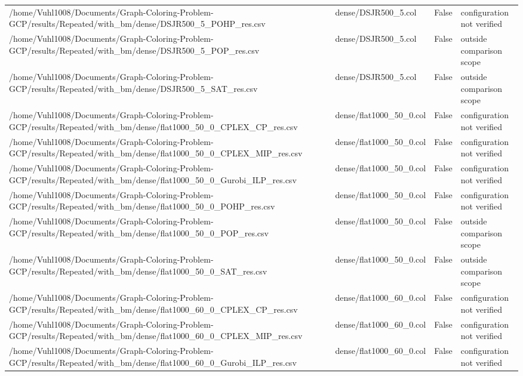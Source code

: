 \begin{table}[htbp]
\begin{tabular}{llll}
/home/Vuhl1008/Documents/Graph-Coloring-Problem-GCP/results/Repeated/with\_bm/dense/DSJR500\_5\_POHP\_res.csv & dense/DSJR500\_5.col & False & configuration not verified \\
/home/Vuhl1008/Documents/Graph-Coloring-Problem-GCP/results/Repeated/with\_bm/dense/DSJR500\_5\_POP\_res.csv & dense/DSJR500\_5.col & False & outside comparison scope \\
/home/Vuhl1008/Documents/Graph-Coloring-Problem-GCP/results/Repeated/with\_bm/dense/DSJR500\_5\_SAT\_res.csv & dense/DSJR500\_5.col & False & outside comparison scope \\
/home/Vuhl1008/Documents/Graph-Coloring-Problem-GCP/results/Repeated/with\_bm/dense/flat1000\_50\_0\_CPLEX\_CP\_res.csv & dense/flat1000\_50\_0.col & False & configuration not verified \\
/home/Vuhl1008/Documents/Graph-Coloring-Problem-GCP/results/Repeated/with\_bm/dense/flat1000\_50\_0\_CPLEX\_MIP\_res.csv & dense/flat1000\_50\_0.col & False & configuration not verified \\
/home/Vuhl1008/Documents/Graph-Coloring-Problem-GCP/results/Repeated/with\_bm/dense/flat1000\_50\_0\_Gurobi\_ILP\_res.csv & dense/flat1000\_50\_0.col & False & configuration not verified \\
/home/Vuhl1008/Documents/Graph-Coloring-Problem-GCP/results/Repeated/with\_bm/dense/flat1000\_50\_0\_POHP\_res.csv & dense/flat1000\_50\_0.col & False & configuration not verified \\
/home/Vuhl1008/Documents/Graph-Coloring-Problem-GCP/results/Repeated/with\_bm/dense/flat1000\_50\_0\_POP\_res.csv & dense/flat1000\_50\_0.col & False & outside comparison scope \\
/home/Vuhl1008/Documents/Graph-Coloring-Problem-GCP/results/Repeated/with\_bm/dense/flat1000\_50\_0\_SAT\_res.csv & dense/flat1000\_50\_0.col & False & outside comparison scope \\
/home/Vuhl1008/Documents/Graph-Coloring-Problem-GCP/results/Repeated/with\_bm/dense/flat1000\_60\_0\_CPLEX\_CP\_res.csv & dense/flat1000\_60\_0.col & False & configuration not verified \\
/home/Vuhl1008/Documents/Graph-Coloring-Problem-GCP/results/Repeated/with\_bm/dense/flat1000\_60\_0\_CPLEX\_MIP\_res.csv & dense/flat1000\_60\_0.col & False & configuration not verified \\
/home/Vuhl1008/Documents/Graph-Coloring-Problem-GCP/results/Repeated/with\_bm/dense/flat1000\_60\_0\_Gurobi\_ILP\_res.csv & dense/flat1000\_60\_0.col & False & configuration not verified \\

\end{tabular}
\end{table}
